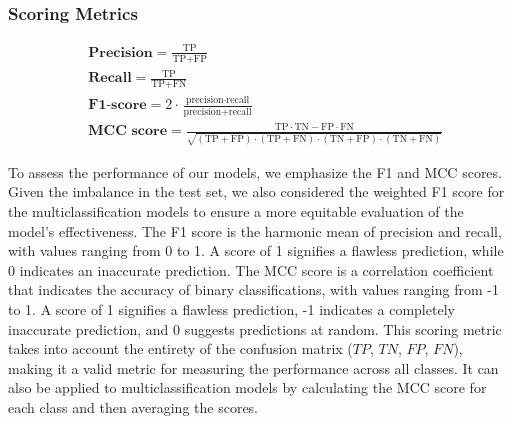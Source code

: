 \documentclass{bioinfo}
\begin{document}
\begin{methods}
\subsubsection{Scoring Metrics}

\begin{align*}
	&\textbf{Precision} = \frac{\text{TP}}{\text{TP} + \text{FP}} \\
    &\textbf{Recall} = \frac{\text{TP}}{\text{TP} + \text{FN}} \\
    &\textbf{F1-score} = 2 \cdot \frac{\text{precision} \cdot \text{recall}}{\text{precision} + \text{recall}} \\
    &\textbf{MCC score} = \frac{\text{TP} \cdot \text{TN} - \text{FP} \cdot \text{FN}}{\sqrt{(\text{TP} + \text{FP}) \cdot (\text{TP} + \text{FN}) \cdot (\text{TN} + \text{FP}) \cdot (\text{TN} + \text{FN})}}
\end{align*}

To assess the performance of our models, we emphasize the F1 and MCC scores. 
Given the imbalance in the test set, we also considered the weighted F1 score for the multiclassification models
to ensure a more equitable evaluation of the model's effectiveness.
The F1 score is the harmonic mean of precision and recall, with values ranging from 0 to 1.
A score of 1 signifies a flawless prediction, while 0 indicates an inaccurate prediction.
The MCC score is a correlation coefficient that indicates the accuracy of binary classifications, with values ranging from -1 to 1. 
A score of 1 signifies a flawless prediction, -1 indicates a completely inaccurate prediction, and 0 suggests predictions at random.
This scoring metric takes into account the entirety of the confusion matrix ($TP$, $TN$, $FP$, $FN$), making it a valid
metric for measuring the performance across all classes.
It can also be applied to multiclassification models by calculating the MCC score for each class and then averaging the scores.


\end{methods}
\end{document}
